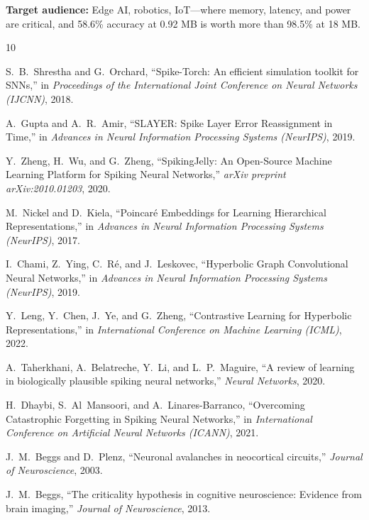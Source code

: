\documentclass[conference]{IEEEtran}
\begin{document}
\textbf{Target audience:} Edge AI, robotics, IoT---where memory, latency, and power are critical, and 58.6\% accuracy at 0.92 MB is worth more than 98.5\% at 18 MB.


\begin{thebibliography}{10}

S.~B.~Shrestha and G.~Orchard, ``Spike-Torch: An efficient simulation toolkit for SNNs,'' in \textit{Proceedings of the International Joint Conference on Neural Networks (IJCNN)}, 2018.

A.~Gupta and A.~R.~Amir, ``SLAYER: Spike Layer Error Reassignment in Time,'' in \textit{Advances in Neural Information Processing Systems (NeurIPS)}, 2019.

Y.~Zheng, H.~Wu, and G.~Zheng, ``SpikingJelly: An Open-Source Machine Learning Platform for Spiking Neural Networks,'' \textit{arXiv preprint arXiv:2010.01203}, 2020.

M.~Nickel and D.~Kiela, ``Poincaré Embeddings for Learning Hierarchical Representations,'' in \textit{Advances in Neural Information Processing Systems (NeurIPS)}, 2017.

I.~Chami, Z.~Ying, C.~Ré, and J.~Leskovec, ``Hyperbolic Graph Convolutional Neural Networks,'' in \textit{Advances in Neural Information Processing Systems (NeurIPS)}, 2019.

Y.~Leng, Y.~Chen, J.~Ye, and G.~Zheng, ``Contrastive Learning for Hyperbolic Representations,'' in \textit{International Conference on Machine Learning (ICML)}, 2022.

A.~Taherkhani, A.~Belatreche, Y.~Li, and L.~P.~Maguire, ``A review of learning in biologically plausible spiking neural networks,'' \textit{Neural Networks}, 2020.

H.~Dhaybi, S.~Al~Mansoori, and A.~Linares-Barranco, ``Overcoming Catastrophic Forgetting in Spiking Neural Networks,'' in \textit{International Conference on Artificial Neural Networks (ICANN)}, 2021.

J.~M.~Beggs and D.~Plenz, ``Neuronal avalanches in neocortical circuits,'' \textit{Journal of Neuroscience}, 2003.

J.~M.~Beggs, ``The criticality hypothesis in cognitive neuroscience: Evidence from brain imaging,'' \textit{Journal of Neuroscience}, 2013.

\end{thebibliography}
\end{document}
